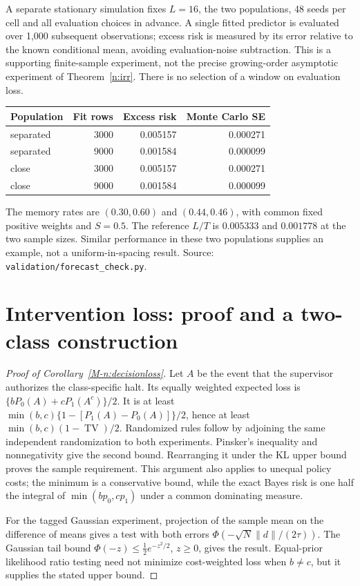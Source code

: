 \documentclass[12pt]{article}
\theoremstyle{definition}
\theoremstyle{remark}
\begin{document}
A separate stationary simulation fixes $L=16$, the two populations, 48 seeds per cell and all evaluation choices in advance. A single fitted predictor is evaluated over 1,000 subsequent observations; excess risk is measured by its error relative to the known conditional mean, avoiding evaluation-noise subtraction. This is a supporting finite-sample experiment, not the precise growing-order asymptotic experiment of Theorem~\ref{n:irr}. There is no selection of a window on evaluation loss.
\begin{center}\begin{tabular}{lrrr}\toprule Population & Fit rows & Excess risk & Monte Carlo SE\\\midrule
separated & 3000 & 0.005157 & 0.000271\\
separated & 9000 & 0.001584 & 0.000099\\
close & 3000 & 0.005157 & 0.000271\\
close & 9000 & 0.001584 & 0.000099\\
\bottomrule\end{tabular}\end{center}
The memory rates are $(0.30,0.60)$ and $(0.44,0.46)$, with common fixed positive weights and $S=0.5$. The reference $L/T$ is $0.005333$ and $0.001778$ at the two sample sizes. Similar performance in these two populations supplies an example, not a uniform-in-spacing result. Source: \nolinkurl{validation/forecast_check.py}.


\section{Intervention loss: proof and a two-class construction}\label{app:revisiondecision}

\begin{proof}[Proof of Corollary~\ref{M-n:decisionloss}]
Let $A$ be the event that the supervisor authorizes the class-specific halt. Its equally weighted expected loss is $\{bP_0(A)+cP_1(A^c)\}/2$. It is at least
$\min(b,c)\{1-[P_1(A)-P_0(A)]\}/2$, hence at least $\min(b,c)(1-\operatorname{TV})/2$. Randomized rules follow by adjoining the same independent randomization to both experiments. Pinsker's inequality and nonnegativity give the second bound. Rearranging it under the KL upper bound proves the sample requirement. This argument also applies to unequal policy costs; the minimum is a conservative bound, while the exact Bayes risk is one half the integral of $\min(bp_0,cp_1)$ under a common dominating measure.

For the tagged Gaussian experiment, projection of the sample mean on the difference of means gives a test with both errors $\Phi(-\sqrt N\|d\|/(2\tau))$. The Gaussian tail bound $\Phi(-z)\le\tfrac12 e^{-z^2/2}$, $z\ge0$, gives the result. Equal-prior likelihood ratio testing need not minimize cost-weighted loss when $b\ne c$, but it supplies the stated upper bound.
\end{proof}
\end{document}
